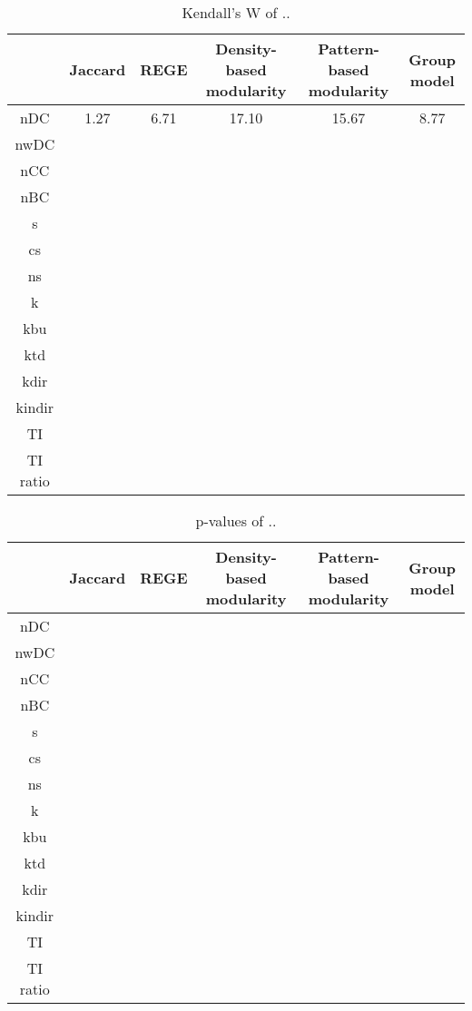 \documentclass{article}
\title{}
\author{Emanuele Giacomuzzo}
\begin{document}
\maketitle

\begin{table}[]
    \centering
    \begin{tabular}{c c c c c c}
          & Jaccard & REGE & Density-based modularity & Pattern-based modularity & Group model \\
          \hline
          nDC & 1.27 & 6.71 & 17.10 & 15.67 & 8.77 \\
          nwDC &  \\
          nCC &  \\
          nBC &  \\
          s &  \\
          cs &  \\
          ns &  \\
          k &  \\
          kbu &  \\
          ktd &  \\
          kdir &  \\
          kindir &  \\
          TI &  \\
          TI ratio&  \\
    \end{tabular}
    \caption{Kendall's W of ..}
    \label{tab:my_label}
\end{table}

\begin{table}[]
    \centering
    \begin{tabular}{c c c c c c}
          & Jaccard & REGE & Density-based modularity & Pattern-based modularity & Group model \\
          \hline
          nDC &  \\
          nwDC &  \\
          nCC &  \\
          nBC &  \\
          s &  \\
          cs &  \\
          ns &  \\
          k &  \\
          kbu &  \\
          ktd &  \\
          kdir &  \\
          kindir &  \\
          TI &  \\
          TI ratio&  \\
    \end{tabular}
    \caption{p-values of .. }
    \label{tab:my_label}
\end{table}
\end{document}
